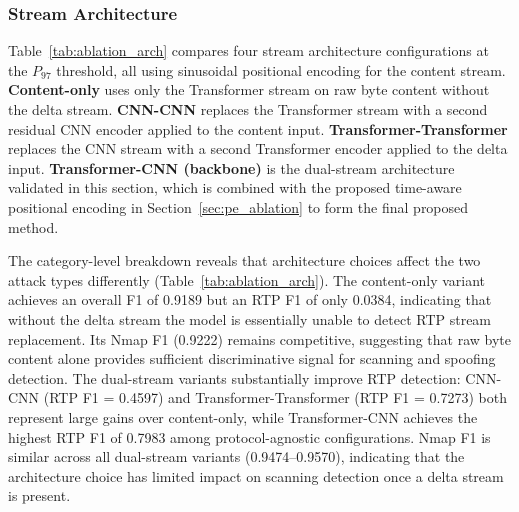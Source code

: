 \subsubsection{Stream Architecture}
\label{sec:arch_ablation}
Table~\ref{tab:ablation_arch} compares four stream architecture configurations at the $P_{97}$ threshold, all using sinusoidal positional encoding for the content stream. \textbf{Content-only} uses only the Transformer stream on raw byte content without the delta stream. \textbf{CNN-CNN} replaces the Transformer stream with a second residual CNN encoder applied to the content input. \textbf{Transformer-Transformer} replaces the CNN stream with a second Transformer encoder applied to the delta input. \textbf{Transformer-CNN (backbone)} is the dual-stream architecture validated in this section, which is combined with the proposed time-aware positional encoding in Section~\ref{sec:pe_ablation} to form the final proposed method.

\begin{table}[!htbp]
\centering
\caption{Ablation study: stream architecture variants (threshold: $P_{97}$ for all, sinusoidal PE). Overall F1: micro-avg (all 27 files); RTP/Nmap F1: macro-avg within category.}
\label{tab:ablation_arch}
\small
{}
\end{table}

The category-level breakdown reveals that architecture choices affect the two attack types differently (Table~\ref{tab:ablation_arch}). The content-only variant achieves an overall F1 of 0.9189 but an RTP F1 of only 0.0384, indicating that without the delta stream the model is essentially unable to detect RTP stream replacement. Its Nmap F1 (0.9222) remains competitive, suggesting that raw byte content alone provides sufficient discriminative signal for scanning and spoofing detection. The dual-stream variants substantially improve RTP detection: CNN-CNN (RTP F1 = 0.4597) and Transformer-Transformer (RTP F1 = 0.7273) both represent large gains over content-only, while Transformer-CNN achieves the highest RTP F1 of 0.7983 among protocol-agnostic configurations. Nmap F1 is similar across all dual-stream variants (0.9474--0.9570), indicating that the architecture choice has limited impact on scanning detection once a delta stream is present.

